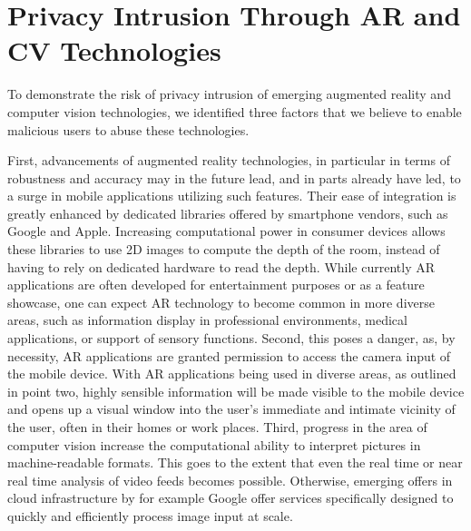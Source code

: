 
\section{Privacy Intrusion Through AR and CV Technologies}

To demonstrate the risk of privacy intrusion of emerging augmented reality and computer vision technologies, we identified three factors that we believe to enable malicious users to abuse these technologies.

First, advancements of augmented reality technologies, in particular in terms of robustness and accuracy may in the future lead, and in parts already have led, to a surge in mobile applications utilizing such features.
Their ease of integration is greatly enhanced by dedicated libraries offered by smartphone vendors, such as Google and Apple.
Increasing computational power in consumer devices allows these libraries to use 2D images to compute the depth of the room, instead of having to rely on dedicated hardware to read the depth.
While currently AR applications are often developed for entertainment purposes or as a feature showcase, one can expect AR technology to become common in more diverse areas, such as information display in professional environments, medical applications, or support of sensory functions.
Second, this poses a danger, as, by necessity, AR applications are granted permission to access the camera input of the mobile device.
With AR applications being used in diverse areas, as outlined in point two, highly sensible information will be made visible to the mobile device and opens up a visual window into the user's immediate and intimate vicinity of the user, often in their homes or work places.
Third, progress in the area of computer vision increase the computational ability to interpret pictures in machine-readable formats. This goes to the extent that even the real time or near real time analysis of video feeds becomes possible. Otherwise, emerging offers in cloud infrastructure by for example Google offer services specifically designed to quickly and efficiently process image input at scale.

